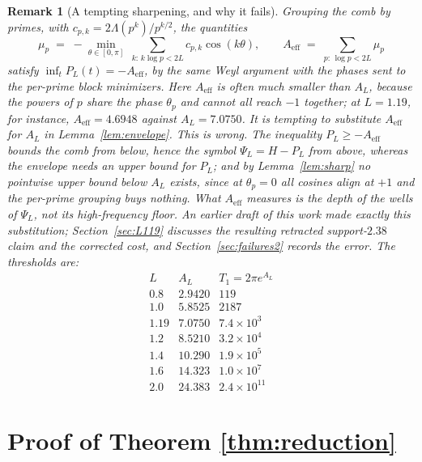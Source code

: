 ﻿\documentclass[11pt]{article}
\newtheorem{remark}[theorem]{Remark}
\newcommand{\Aeff}{A_{\mathrm{eff}}}
\begin{document}
\begin{remark}[A tempting sharpening, and why it fails]
\label{rem:nosharp}
Grouping the comb by primes, with
$c_{p,k}=2\Lambda(p^k)/p^{k/2}$, the quantities
\[
\mu_p\;=\;-\min_{\theta\in[0,\pi]}\ \sum_{k:\,k\log p<2L}
c_{p,k}\cos(k\theta),
\qquad
\Aeff\;=\;\sum_{p:\,\log p<2L}\mu_p
\]
satisfy $\inf_tP_L(t)=-\Aeff$, by the same Weyl argument with the
phases sent to the per-prime block minimizers.  Here $\Aeff$ is often
much smaller than $A_L$, because the powers of $p$ share the phase
$\theta_p$ and cannot all reach $-1$ together; at $L=1.19$, for
instance, $\Aeff=4.6948$ against $A_L=7.0750$.  It is tempting to
substitute $\Aeff$ for $A_L$ in Lemma~\ref{lem:envelope}.  This is
wrong.  The inequality $P_L\ge-\Aeff$ bounds the comb from below, hence
the symbol $\Psi_L=H-P_L$ from above, whereas the envelope needs an
upper bound for $P_L$; and by Lemma~\ref{lem:sharp} no pointwise upper
bound below $A_L$ exists, since at $\theta_p=0$ all cosines align at
$+1$ and the per-prime grouping buys nothing.  What $\Aeff$ measures is
the depth of the wells of $\Psi_L$, not its high-frequency floor.  An
earlier draft of this work made exactly this substitution;
Section~\ref{sec:L119} discusses the resulting retracted
support-$2.38$ claim and the corrected cost, and
Section~\ref{sec:failures2} records the error.  The thresholds are:
\[
\begin{array}{c|cc}
L & A_L & T_1=2\pi e^{A_L}\\
\hline
0.8 & 2.9420 & 119\\
1.0 & 5.8525 & 2187\\
1.19 & 7.0750 & 7.4\times10^3\\
1.2 & 8.5210 & 3.2\times10^4\\
1.4 & 10.290 & 1.9\times10^5\\
1.6 & 14.323 & 1.0\times10^7\\
2.0 & 24.383 & 2.4\times10^{11}
\end{array}
\]
\end{remark}

\section{Proof of Theorem \ref{thm:reduction}}\label{sec:reduction}
\end{document}
